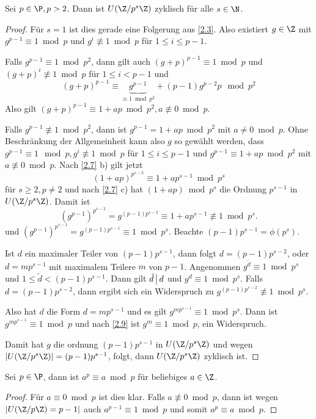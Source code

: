 \begin{st} \label{2.8}
	Sei $p \in \P, p > 2$.
	Dann ist $U(\Z / p^s \Z)$ zyklisch für alle $s \in \N$.
	\begin{proof}
		Für $s = 1$ ist dies gerade eine Folgerung aus \ref{2.3}.
		Also existiert $g \in \Z$ mit $g^{p-1} \equiv 1 \bmod p$ und $g^i \not\equiv 1 \bmod p$ für $1 \le i \le p -1$.

		Falls $g^{p-1} \equiv 1 \bmod p^2$, dann gilt auch $(g + p)^{p-1} \equiv 1 \bmod p$ und $(g + p)^i \not\equiv 1 \bmod p$ für $1 \le i < p-1$ und
		\[
			(g + p)^{p - 1} \equiv \underbrace{g^{p-1}}_{\equiv 1 \bmod p^2} + (p-1)g^{p-2} p \mod p^2
		\]
		Also gilt $(g + p)^{p-1} \equiv 1 + ap \bmod p^2, a \not\equiv 0 \bmod p$.

		Falls $g^{p-1} \not\equiv 1 \bmod p^2$, dann ist $g^{p-1} = 1 + ap \bmod p^2$ mit $a \neq 0 \bmod p$.
		Ohne Beschränkung der Allgemeinheit kann also $g$ so gewählt werden, dass $g^{p-1} \equiv 1 \mod p, g^i \not\equiv 1 \bmod p$ für $1 \le i \le p-1$ und  $g^{p-1} \equiv 1 + ap \bmod p^2$ mit $a \not\equiv 0 \bmod p$.
		Nach \ref{2.7} b) gilt jetzt
		\[
			(1 + ap)^{p^{s-2}} \equiv 1 + ap^{s-1} \bmod p^s
		\]
		für $s \ge 2, p \neq 2$ und nach \ref{2.7} c) hat $(1 + ap) \bmod p^s$ die Ordnung $p^{s-1}$ in $U(\Z / p^s \Z)$.
		Damit ist
		\[
			(g^{p-1})^{p^{s-2}}
			= g^{(p-1)p^{s-2}}
			\equiv 1 + ap^{s-1}
			\not\equiv 1 \bmod p^s.
		\]
		und $(g^{p-1})^{p^{s-1}} = g^{(p-1)p^{s-1}} \equiv 1 \bmod p^s$.
		Beachte $(p-1)p^{s-1} = \phi(p^s)$.

		Ist $d$ ein maximaler Teiler von $(p-1)p^{s-1}$, dann folgt $d  = (p-1)p^{s-2}$, oder $d = m p^{s-1}$ mit maximalem Teilere $m$ von $p-1$.
		Angenommen $g^{\tilde d} \equiv 1 \bmod p^s$ und $1 \le \tilde d < (p-1)p^{s-1}$.
		Dann gilt $\tilde d \divs d$ und $g^d \equiv 1 \bmod p^s$.
		Falls $d = (p-1)p^{s-2}$, dann ergibt sich ein Widerspruch zu $g^{(p-1)p^{s-2}} \not\equiv 1 \bmod p^s$.

		Also hat $d$ die Form $d = mp^{s-1}$ und es gilt $g^{mp^{s-1}} \equiv 1 \bmod p^s$.
		Dann ist $g^{mp^{s-1}} \equiv 1 \bmod p$ und nach \ref{2.9} ist $g^m \equiv 1 \bmod p$, ein Widerspruch.

		Damit hat $g$ die ordnung $(p-1)p^{s-1}$ in $U(\Z / p^s \Z)$ und wegen $|U(\Z / p^s \Z)| = (p-1)p^{s-1}$, folgt, dann $U(\Z / p^s \Z)$ zyklisch ist.
	\end{proof}
\end{st}

\begin{lem} \label{2.9}
	Sei $p \in \P$, dann ist $a^p \equiv a \bmod p$ für beliebiges $a \in \Z$.
	\begin{proof}
		Für $a \equiv 0 \bmod p$ ist dies klar.
		Falls $a \not\equiv 0 \bmod p$, dann ist wegen $| U(\Z / p\Z) = p - 1|$ auch $a^{p-1} \equiv 1 \bmod p$ und somit $a^p \equiv a \bmod p$.
	\end{proof}
\end{lem}

